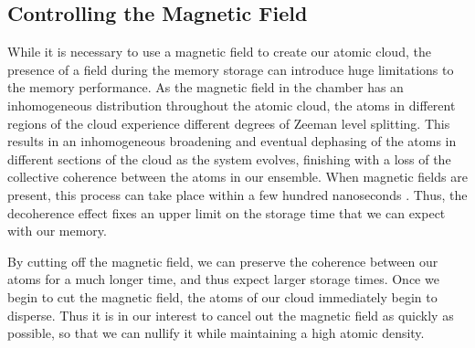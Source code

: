 
\subsection{Controlling the Magnetic Field} 

While it is necessary to use a magnetic field to create our atomic cloud, the presence of a field during the memory storage can introduce huge limitations to the memory performance.  As the magnetic field in the chamber has an inhomogeneous distribution throughout the atomic cloud, the atoms in different regions of the cloud experience different degrees of Zeeman level splitting.  This results in an inhomogeneous broadening and eventual dephasing of the atoms in different sections of the cloud as the system evolves, finishing with a loss of the collective coherence between the atoms in our ensemble.  When magnetic fields are present, this process can take place within a few hundred nanoseconds \cite{felinto2005control}.  Thus, the decoherence effect fixes an upper limit on the storage time that we can expect with our memory.

By cutting off the magnetic field, we can preserve the coherence between our atoms for a much longer time, and thus expect larger storage times.  Once we begin to cut the magnetic field, the atoms of our cloud immediately begin to disperse.  Thus it is in our interest to cancel out the magnetic field as quickly as possible, so that we can nullify it while maintaining a high atomic density.

